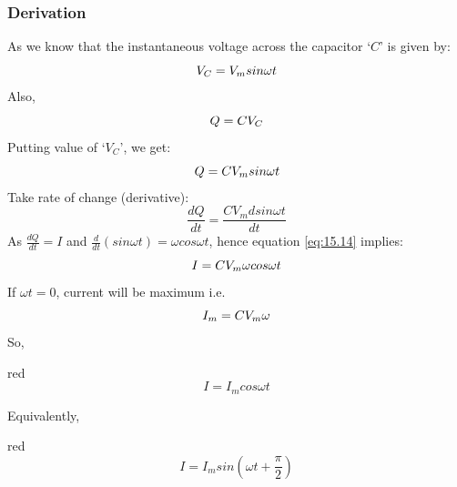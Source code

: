 \subsubsection{Derivation}
As we know that the instantaneous voltage across the capacitor ‘$C$’ is given by:
\begin{equation}\notag
    V_{C} = V_{m} sin \omega t
\end{equation}
Also,
\begin{equation}\notag
   Q = CV_{C}
\end{equation}
Putting value of `$V_{C}$', we get:
\begin{equation}\notag
   Q = C V_{m} sin \omega t
\end{equation}
Take rate of change (derivative):
\begin{equation}\label{eq:15.14}
   \frac{dQ}{dt} = \frac{C V_{m} dsin \omega t}{dt}
\end{equation}
As $\frac{dQ}{dt} = I$ and $\frac{d}{dt}(sin\omega t) = \omega cos \omega t$,
hence equation \ref{eq:15.14} implies:
\begin{equation}\notag
   I = C V_{m} \omega cos \omega t
\end{equation}
If $\omega t=0$, current will be maximum i.e.
\begin{equation}\notag
   I_{m} = C V_{m} \omega 
\end{equation}
So,
\begin{mybox}{red}{}
    \begin{equation}\label{eq:15.15}
        I = I_{m} cos \omega t
    \end{equation}  
\end{mybox}
\noindent Equivalently,
\begin{mybox}{red}{}
\begin{equation}\label{eq:15.16}
    I = I_{m} sin(\omega t + \frac{\pi}{2})
\end{equation}
\end{mybox}
